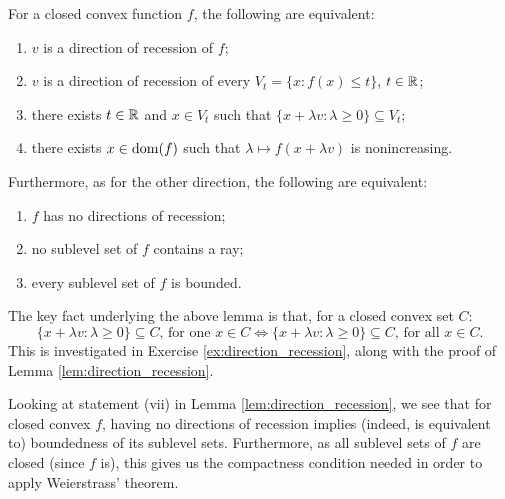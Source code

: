 \begin{Lemma}
\label{lem:direction_recession}
For a closed convex function $f$, the following are equivalent: 
\begin{enumerate}[label=(\roman*)]
\item $v$ is a direction of recession of $f$;
\item $v$ is a direction of recession of every $V_t = \{x : f(x) \leq t\}$, $t
  \in \mathbb{R}$; 
\item there exists $t \in \mathbb{R}$ and $x \in V_t$ such that $\{x + \lambda v :
  \lambda \geq 0\} \subseteq V_t$;  
\item there exists $x \in \operatorname{dom}(f)$ such that $\lambda \mapsto f(x + \lambda v)$ 
  is nonincreasing.
\end{enumerate}

Furthermore, as for the other direction, the following are equivalent: 
\begin{enumerate}[resume, label=(\roman*)]
\item $f$ has no directions of recession; 
\item no sublevel set of $f$ contains a ray;
\item every sublevel set of $f$ is bounded. 
\end{enumerate}
\end{Lemma}

The key fact underlying the above lemma is that, for a closed convex set $C$:  
\begin{equation}
\label{eq:one_iff_all}
\{x + \lambda v : \lambda \geq 0\} \subseteq C, \, \text{for one $x \in C$} \iff  
\{x + \lambda v : \lambda \geq 0\} \subseteq C, \, \text{for all $x \in C$}. 
\end{equation}
This is investigated in Exercise \ref{ex:direction_recession}, along with the
proof of Lemma \ref{lem:direction_recession}.

Looking at statement (vii) in Lemma \ref{lem:direction_recession}, we see that
for closed convex $f$, having no directions of recession implies (indeed, is
equivalent to) boundedness of its sublevel sets. Furthermore, as all sublevel
sets of $f$ are closed (since $f$ is), this gives us the compactness condition
needed in order to apply Weierstrass' theorem.     

